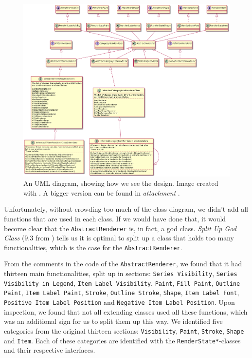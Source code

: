 \documentclass[11pt]{article}
\begin{document}
	\begin{figure}[H]
		\centering
		\includegraphics[scale=0.3]{pictures/class-diagram-ours.png}
		\caption{An UML diagram, showing how we see the design. Image created with \cite{plantuml}. A bigger version can be found in \textsl{attachment \pageref{class-diagram-ours}}.}
		\label{fig:UML-ours}
	\end{figure}
	
	Unfortunately, without crowding too much of the class diagram, we didn't add all functions that are used in each class. If we would have done that, it would become clear that the \texttt{AbstractRenderer} is, in fact, a god class. \textsl{Split Up God Class} (9.3 from \cite{demeyer2009object}) tells us it is optimal to split up a class that holds too many functionalities, which is the case for the \texttt{AbstractRenderer}.
	
	From the comments in the code of the \texttt{AbstractRenderer}, we found that it had thirteen main functionalities, split up in sections: \texttt{Series Visibility}, \texttt{Series Visibility in Legend}, \texttt{Item Label Visibility}, \texttt{Paint}, \texttt{Fill Paint}, \texttt{Outline Paint}, \texttt{Item Label Paint}, \texttt{Stroke}, \texttt{Outline Stroke}, \texttt{Shape}, \texttt{Item Label Font}, \texttt{Positive Item Label Position} and \texttt{Negative Item Label Position}. Upon inspection, we found that not all extending classes used all these functions, which was an additional sign for us to split them up this way. We identified five categories from the original thirteen sections: \texttt{Visibility}, \texttt{Paint}, \texttt{Stroke}, \texttt{Shape} and \texttt{Item}. Each of these categories are identified with the \texttt{RenderState*}-classes and their respective interfaces.
	
\end{document}
